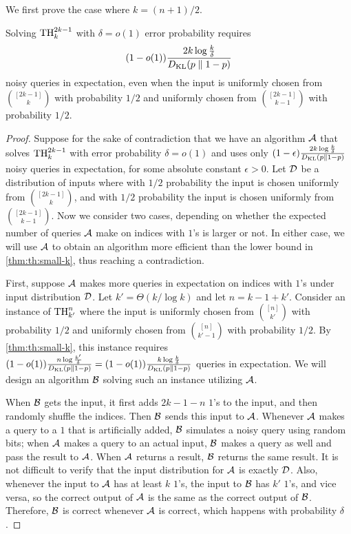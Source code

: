 We first prove the case where $k=(n+1)/2$.
\begin{lemma}
\label{lem:th:maj}
  Solving $\Threshold{2k-1}{k}$ with $
\delta = o(1)$ error probability requires
\[
(1-o(1))\frac{2k \log \frac{k}{\delta}}{\DKL}
\]
noisy queries in expectation, even when the input is uniformly chosen from $\binom{[2k-1]}{k}$ with probability $1/2$ and uniformly chosen from $\binom{[2k-1]}{k-1}$ with probability $1/2$.
\end{lemma}
\begin{proof}
Suppose for the sake of contradiction that we have an algorithm $\cA$ that solves $\Threshold{2k-1}{k}$ with error probability $\delta = o(1)$ and uses only $(1-\epsilon)\frac{2k \log \frac{k}{\delta}}{\DKL}$ noisy queries in expectation, for some absolute constant $\epsilon>0$. Let $\cD$ be a distribution of inputs where with $1/2$ probability the input is chosen uniformly from $\binom{[2k-1]}{k}$, and with $1/2$ probability the input is chosen uniformly from $\binom{[2k-1]}{k-1}$. Now we consider two cases, depending on whether the expected number of queries $\cA$ make on indices with $1$'s is larger or not. In either case, we will use $\cA$ to obtain an algorithm more efficient than the lower bound in \cref{thm:th:small-k}, thus reaching a contradiction.

First, suppose $\cA$ makes more queries in expectation on indices with $1$'s under input distribution $\cD$. Let $k' = \Theta(k / \log k)$ and let $n = k - 1 + k'$. Consider an instance of $\Threshold{n}{k'}$ where the input is uniformly chosen from $\binom{[n]}{k'}$ with probability $1/2$ and uniformly chosen from $\binom{[n]}{k'-1}$ with probability $1/2$. By \cref{thm:th:small-k}, this instance requires $(1-o(1)) \frac{n \log \frac{k'}{\delta}}{\DKL}=(1-o(1)) \frac{k \log \frac{k}{\delta}}{\DKL}$ queries in expectation. We will design an algorithm $\cB$ solving such an instance utilizing $\cA$.

When $\cB$ gets the input, it first adds $2k-1-n$ $1$'s to the input, and then randomly shuffle the indices. Then $\cB$ sends this input to $\cA$. Whenever $\cA$ makes a query to a $1$ that is artificially added, $\cB$ simulates a noisy query using random bits; when $\cA$ makes a query to an actual input, $\cB$ makes a query as well and pass the result to $\cA$. When $\cA$ returns a result, $\cB$ returns the same result. It is not difficult to verify that the input distribution for $\cA$ is exactly $\cD$. Also, whenever the input to $\cA$ has at least $k$ $1$'s, the input to $\cB$ has $k'$ $1$'s, and vice versa, so the correct output of $\cA$ is the same as  the correct output of $\cB$. Therefore, $\cB$ is correct whenever $\cA$ is correct, which happens with probability $\delta$.


\end{proof}
